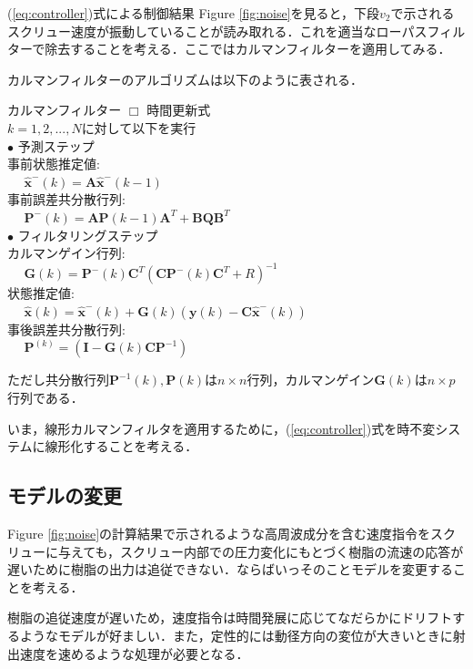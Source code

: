\documentclass[twocolumn,oneside,a4paper]{article}
\begin{document}
(\ref{eq:controller})式による制御結果
Figure \ref{fig:noise}を見ると，下段$v_2$で示されるスクリュー速度が振動していることが読み取れる．これを適当なローパスフィルターで除去することを考える．ここではカルマンフィルターを適用してみる．

カルマンフィルターのアルゴリズムは以下のように表される．
  \begin{itembox}[l]{カルマンフィルター}
    $\Box$ 時間更新式\\
    $k=1,2,...,N$に対して以下を実行\\
	$\bullet$ 予測ステップ\\
	事前状態推定値: \\
	$\:\:\:\:\:\: \hat{\bm{x}}^{-}(k) = \bm{A}\hat{\bm{x}}^{-}(k-1)$\\
	事前誤差共分散行列: \\
	$\:\:\:\:\:\: \bm{P}^{-}(k)=\bm{A}\bm{P}(k-1)\bm{A}^{T}+\bm{BQ}\bm{B}^T$\\		
	$\bullet$ フィルタリングステップ\\
	カルマンゲイン行列: \\
	$\:\:\:\:\:\: \bm{G}(k)=\bm{P}^{-}(k)\bm{C}^T(\bm{C}\bm{P}^{-}(k)\bm{C}^{T}+R)^{-1}$\\
	状態推定値: \\
	$\:\:\:\:\:\: \hat{\bm{x}}(k) = \hat{\bm{x}}^{-}(k) + \bm{G}(k)(\bm{y}(k)-\bm{C}\hat{\bm{x}}^{-}(k))$\\
	事後誤差共分散行列: \\
	$\:\:\:\:\:\: \bm{P}^(k)=(\bm{I}-\bm{G}(k)\bm{C}\bm{P}^{-1})$
  \end{itembox}

ただし共分散行列$\bm{P}^{-1}(k), \bm{P}(k)$は$n \times n$行列，カルマンゲイン$\bm{G}(k)$は$n \times p$行列である．

いま，線形カルマンフィルタを適用するために，(\ref{eq:controller})式を時不変システムに線形化することを考える．


\subsection{モデルの変更}
Figure \ref{fig:noise}の計算結果で示されるような高周波成分を含む速度指令をスクリューに与えても，スクリュー内部での圧力変化にもとづく樹脂の流速の応答が遅いために樹脂の出力は追従できない．ならばいっそのことモデルを変更することを考える．

樹脂の追従速度が遅いため，速度指令は時間発展に応じてなだらかにドリフトするようなモデルが好ましい．また，定性的には動径方向の変位が大きいときに射出速度を速めるような処理が必要となる．
\end{document}
